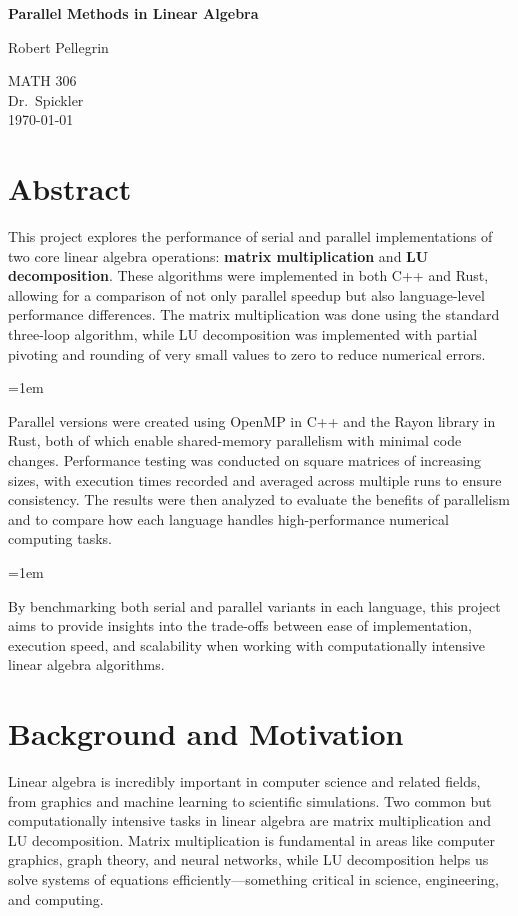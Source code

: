 \documentclass[12pt]{article}
\begin{document}
\begin{titlepage}
    \centering
    \vspace*{2in}
    {\Huge\bfseries Parallel Methods in Linear Algebra\par}
    \vspace{1in}
    {\Large Robert Pellegrin\par}
    \vspace{0.5in}
    {\large MATH 306\\ Dr.\ Spickler \\ \today\par}
    \vfill
\end{titlepage}

\newpage
\section*{Abstract}
This project explores the performance of serial and parallel implementations of two core linear algebra operations: \textbf{matrix multiplication}
and \textbf{LU decomposition}. These algorithms were implemented in both C++ and Rust, allowing for a comparison of not only parallel speedup but
also language-level performance differences. The matrix multiplication was done using the standard three-loop algorithm, while LU decomposition
was implemented with partial pivoting and rounding of very small values to zero to reduce numerical errors.

\parskip=1em

Parallel versions were created using OpenMP in C++ and the Rayon library in Rust, both of which enable shared-memory parallelism with minimal
code changes. Performance testing was conducted on square matrices of increasing sizes, with execution times recorded and averaged across
multiple runs to ensure consistency. The results were then analyzed to evaluate the benefits of parallelism and to compare how each language
handles high-performance numerical computing tasks.

\parskip=1em


By benchmarking both serial and parallel variants in each language, this project aims to provide insights into the trade-offs between ease of
implementation, execution speed, and scalability when working with computationally intensive linear algebra algorithms.

\section{Background and Motivation}
Linear algebra is incredibly important in computer science and related fields, from graphics and machine learning to scientific simulations.
Two common but computationally intensive tasks in linear algebra are matrix multiplication and LU decomposition. Matrix multiplication is fundamental
in areas like computer graphics, graph theory, and neural networks, while LU decomposition helps us solve systems of equations
efficiently---something critical in science, engineering, and computing.
\end{document}
